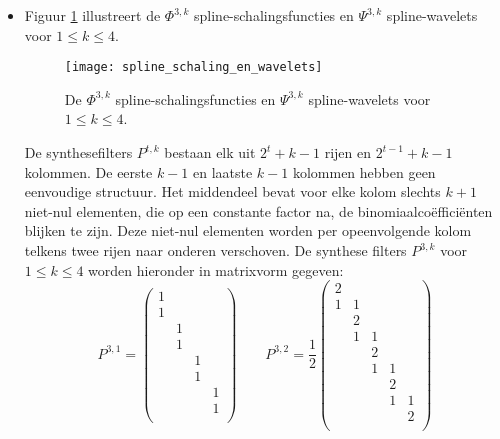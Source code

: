 \begin{enumerate}
			
	{
		\begin{itemize} 
			\item Figuur \ref{fig:spline_schaling_wavelet} illustreert de $\Phi^{3, k}$ spline-schalingsfuncties en $\Psi^{3, k}$ spline-wavelets voor  $1 \leq k \leq 4$.
			\begin{figure}[ht]
				\centering
				\texttt{[image: spline\_schaling\_en\_wavelets]}
				\caption{De $\Phi^{3, k}$ spline-schalingsfuncties en $\Psi^{3, k}$ spline-wavelets voor $1 \leq k \leq 4$.}
				\label{fig:spline_schaling_wavelet}
			\end{figure}
			De synthesefilters $P^{t, k}$ bestaan elk uit $2^t + k -1$ rijen en $2^{t - 1} + k - 1$ kolommen. De eerste $k-1$ en laatste $k-1$ kolommen hebben geen eenvoudige structuur. Het middendeel bevat voor elke kolom slechts $k + 1$ niet-nul elementen, die op een constante factor na, de binomiaalcoëfficiënten blijken te zijn. Deze niet-nul elementen worden per opeenvolgende kolom telkens twee rijen naar onderen verschoven. De synthese filters $P^{3, k}$ voor $1 \leq k \leq 4$ worden hieronder in matrixvorm gegeven:
			$$
			P^{3, 1} = 
			\begin{pmatrix}
				1 &   &   &   \\
				1 &   &   &   \\
				  & 1 &   &   \\
				  & 1 &   &   \\
				  &   & 1 &   \\
				  &   & 1 &  \\
				  &   &   & 1 \\
				  &   &   & 1 \\
			\end{pmatrix}
			\qquad
			P^{3, 2} = \frac{1}{2}
			\begin{pmatrix}
				2 &   &   &   & \\
				1 & 1 &   &   & \\
				  & 2 &   &   & \\
				  & 1 & 1 &   & \\
				  &   & 2 &   & \\
				  &   & 1 & 1 & \\
				  &   &   & 2 & \\
				  &   &   & 1 & 1\\
				  &   &   &   & 2\\

\end{pmatrix}$$
\end{itemize}}
\end{enumerate}
